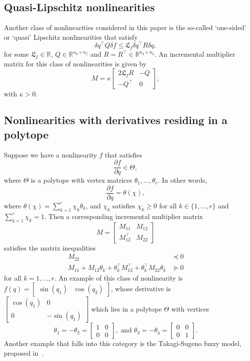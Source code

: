 \documentclass[times, doublespace]{rncauth}
\begin{document}
\subsection{Quasi-Lipschitz nonlinearities}
Another class of nonlinearities considered in this paper is the so-called `one-sided' or `quasi' Lipschitz nonlinearities that satisfy
\[
\delta q^\top Q \delta f \le \mathfrak L_f \delta q^\top R\delta q,
\]
for some $\mathfrak L_f\in\mathbb{R}$, $Q\in\mathbb{R}^{n_q\times n_f}$ and $R=R^\top\in\mathbb{R}^{n_q\times n_q}$. An incremental multiplier matrix for this class of nonlinearities is given by
\[
M = \kappa\begin{bmatrix}
2 \mathfrak L_f R & -Q \\ -Q^\top & 0
\end{bmatrix},
\]
with $\kappa >0$.
\subsection{Nonlinearities with derivatives residing in a polytope}
Suppose we have a nonlinearity $f$ that satisfies
\[
\frac{\partial f}{\partial q} \in \Theta,
\]
where $\Theta$ is a polytope with vertex matrices $\theta_1,\ldots,\theta_r$. In other words, 
\[
\frac{\partial f}{\partial q} = \theta(\chi),
\]
where $\theta(\chi) = \sum_{k=1}^r \chi_k \theta_k$, and $\chi_k$ satisfies $\chi_k\ge 0$ for all $k\in\{1,\ldots, r\}$ and $\sum_{k=1}^r \chi_k = 1$. Then a corresponding incremental multiplier matrix
\begin{equation}\label{eq:imm_con}
M = \begin{bmatrix}
M_{11} & M_{12} \\ M_{12}^\top & M_{22}
\end{bmatrix}
\end{equation}
satisfies the matrix inequalities
\begin{align*}
M_{22} &\preceq 0\\
M_{11} + M_{12}\theta_k + \theta_k^\top M_{12}^\top + \theta_k^\top M_{22} \theta_k &\succeq 0
\end{align*}
for all $k=1,\ldots, r$. An example of this class of nonlinearity is $f(q) = \begin{bmatrix}
\sin(q_1) & \cos(q_2)
\end{bmatrix}$, whose derivative is $\begin{bmatrix}
\cos(q_1) & 0 \\ 0 & -\sin(q_1)
\end{bmatrix}$ which lies in a polytope $\Theta$ with vertices
\[
\theta_1 = -\theta_2 = \begin{bmatrix}
1 & 0 \\ 0 & 0
\end{bmatrix}, \text{ and } \theta_3 = -\theta_4 = \begin{bmatrix}
0 & 0 \\ 0 & 1
\end{bmatrix}.
\]
Another example that falls into this category is the Takagi-Sugeno fuzzy model, proposed in~\cite{Sugeno1985}.
\end{document}

